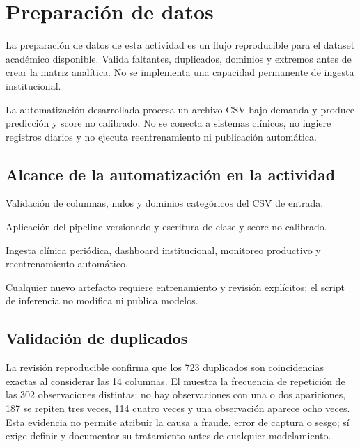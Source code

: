 \section{Preparación de datos}

La preparación de datos de esta actividad es un flujo reproducible para el dataset académico disponible. Valida faltantes, duplicados, dominios y extremos antes de crear la matriz analítica. No se implementa una capacidad permanente de ingesta institucional.

La automatización desarrollada procesa un archivo CSV bajo demanda y produce predicción y score no calibrado. No se conecta a sistemas clínicos, no ingiere registros diarios y no ejecuta reentrenamiento ni publicación automática.

\subsection{Alcance de la automatización en la actividad}

\begin{description}[style=nextline]
  \item[Al ejecutar el comando] Validación de columnas, nulos y dominios categóricos del CSV de entrada.
  \item[Inferencia batch] Aplicación del pipeline versionado y escritura de clase y score no calibrado.
  \item[Fuera de alcance] Ingesta clínica periódica, dashboard institucional, monitoreo productivo y reentrenamiento automático.
  \item[Control de versiones] Cualquier nuevo artefacto requiere entrenamiento y revisión explícitos; el script de inferencia no modifica ni publica modelos.
\end{description}

\subsection{Validación de duplicados}

La revisión reproducible confirma que los 723 duplicados son coincidencias exactas al considerar las 14 columnas. El  muestra la frecuencia de repetición de las 302 observaciones distintas: no hay observaciones con una o dos apariciones, 187 se repiten tres veces, 114 cuatro veces y una observación aparece ocho veces. Esta evidencia no permite atribuir la causa a fraude, error de captura o sesgo; sí exige definir y documentar su tratamiento antes de cualquier modelamiento.

